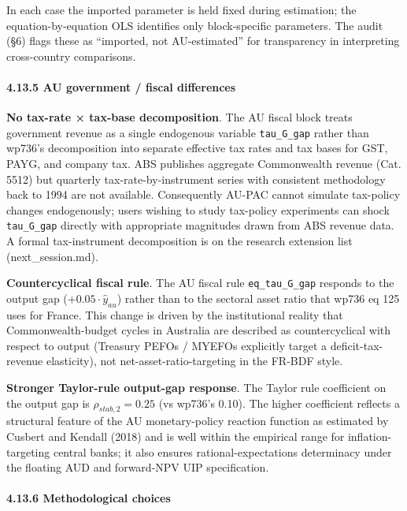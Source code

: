 \documentclass[
]{article}
\begin{document}
In each case the imported parameter is held fixed during estimation; the
equation-by-equation OLS identifies only block-specific parameters. The
audit (§6) flags these as ``imported, not AU-estimated'' for
transparency in interpreting cross-country comparisons.

\paragraph{4.13.5 AU government / fiscal
differences}\label{au-government-fiscal-differences}

\textbf{No tax-rate × tax-base decomposition}. The AU fiscal block
treats government revenue as a single endogenous variable
\texttt{tau\_G\_gap} rather than wp736's decomposition into separate
effective tax rates and tax bases for GST, PAYG, and company tax. ABS
publishes aggregate Commonwealth revenue (Cat. 5512) but quarterly
tax-rate-by-instrument series with consistent methodology back to 1994
are not available. Consequently AU-PAC cannot simulate tax-policy
changes endogenously; users wishing to study tax-policy experiments can
shock \texttt{tau\_G\_gap} directly with appropriate magnitudes drawn
from ABS revenue data. A formal tax-instrument decomposition is on the
research extension list (next\_session.md).

\textbf{Countercyclical fiscal rule}. The AU fiscal rule
\texttt{eq\_tau\_G\_gap} responds to the output gap
(\(+0.05 \cdot \hat{y}_{au}\)) rather than to the sectoral asset ratio
that wp736 eq 125 uses for France. This change is driven by the
institutional reality that Commonwealth-budget cycles in Australia are
described as countercyclical with respect to output (Treasury PEFOs /
MYEFOs explicitly target a deficit-tax-revenue elasticity), not
net-asset-ratio-targeting in the FR-BDF style.

\textbf{Stronger Taylor-rule output-gap response}. The Taylor rule
coefficient on the output gap is \(\rho_{stab,2} = 0.25\) (vs wp736's
0.10). The higher coefficient reflects a structural feature of the AU
monetary-policy reaction function as estimated by Cusbert and Kendall
(2018) and is well within the empirical range for inflation-targeting
central banks; it also ensures rational-expectations determinacy under
the floating AUD and forward-NPV UIP specification.

\paragraph{4.13.6 Methodological choices}\label{methodological-choices}
\end{document}
